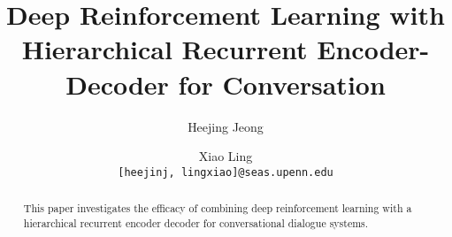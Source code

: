 \documentclass[11pt,a4paper]{article}
\title{Deep Reinforcement Learning with Hierarchical Recurrent Encoder-Decoder for Conversation}
\author{Heejing Jeong \and Xiao Ling\\
  {\tt [heejinj, lingxiao]@seas.upenn.edu}}
\date{}
\begin{document}
\maketitle

\begin{abstract}

This paper investigates the efficacy of combining deep reinforcement learning with a hierarchical recurrent encoder decoder for conversational dialogue systems. 

\end{abstract}





\baselineskip



\end{document}
